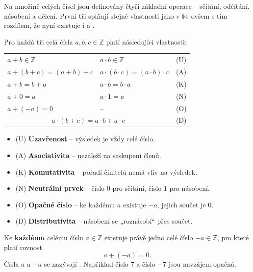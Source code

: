 \documentclass[12pt,a4paper]{article}
\begin{document}
Na množině celých čísel jsou definovány čtyři základní operace – sčítání, odčítání, násobení a dělení.  
První tři splňují stejné vlastnosti jako v $\mathbb{N}$, ovšem s tím rozdílem, že nyní existuje i 
 a . 

\begin{definitionbox}
Pro každá tři celá čísla $a, b, c \in \mathbb{Z}$ platí následující vlastnosti:

\begin{tabular}{p{5cm} p{4cm} p{2cm}}
$a+b \in \mathbb{Z}$ & $a \cdot b \in \mathbb{Z}$ & \hfill(U) \\
$a+(b+c) = (a+b)+c$ & $a \cdot (b \cdot c) = (a \cdot b)\cdot c$ & \hfill(A) \\
$a+b = b+a$ & $a \cdot b = b \cdot a$ & \hfill(K) \\
$a+0 = a$ & $a \cdot 1 = a$ & \hfill(N) \\
$a + (-a) = 0$ & – & \hfill(O) \\
\multicolumn{2}{c}{ $a \cdot (b+c) = a\cdot b + a\cdot c$ } & \hfill(D) \\
\end{tabular}
\end{definitionbox}

\noindent
\begin{itemize}
    \item (U) \textbf{Uzavřenost} – výsledek je vždy celé číslo.  
    \item (A) \textbf{Asociativita} – nezáleží na seskupení členů.  
    \item (K) \textbf{Komutativita} – pořadí činitelů nemá vliv na výsledek.  
    \item (N) \textbf{Neutrální prvek} – číslo $0$ pro sčítání, číslo $1$ pro násobení.  
    \item (O) \textbf{Opačné číslo} – ke každému $a$ existuje $-a$, jejich součet je $0$.  
    \item (D) \textbf{Distributivita} – násobení se „roznásobí“ přes součet.  
\end{itemize}

Ke \textbf{každému} celému číslu $a \in \mathbb{Z}$ existuje právě jedno celé číslo $-a \in \mathbb{Z}$, 
pro které platí rovnost
\[
a + (-a) = 0.
\]
Čísla $a$ a $-a$ se nazývají .  
Například číslo $7$ a číslo $-7$ jsou navzájem opačná.
\end{document}
